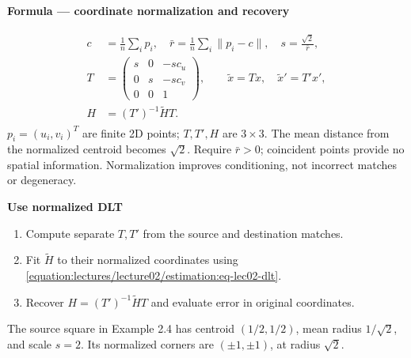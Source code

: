 \documentclass[letterpaper,11pt,english,openany,oneside]{jupyterBook}
\begin{document}
\begin{TextbookBox}
\textbf{Formula — coordinate normalization and recovery}\par\smallskip
\begin{equation}\label{equation:lectures/lecture02/estimation:eq-lec02-normalize}
\begin{split}\begin{aligned}
c&=\frac1n\sum_i p_i,\quad
\bar r=\frac1n\sum_i\|p_i-c\|,\quad s=\frac{\sqrt2}{\bar r},\\
T&=\begin{pmatrix}s&0&-sc_u\\0&s&-sc_v\\0&0&1\end{pmatrix},\qquad
\widetilde x=Tx,\quad \widetilde x'=T'x',\\
H&=(T')^{-1}\widetilde H T.
\end{aligned}\end{split}
\end{equation}
\sphinxAtStartPar
\(p_i=(u_i,v_i)^T\) are finite 2D points; \(T,T',H\) are \(3\times3\). The mean distance from the normalized centroid becomes \(\sqrt2\). Require \(\bar r>0\); coincident points provide no spatial information. Normalization improves conditioning, not incorrect matches or degeneracy.

\end{TextbookBox}

\begin{TextbookBox}
\textbf{Use normalized DLT}\par\smallskip
\begin{enumerate}
%
\item {}
\sphinxAtStartPar
Compute separate \(T,T'\) from the source and destination matches.

\item {}
\sphinxAtStartPar
Fit \(\widetilde H\) to their normalized coordinates using \eqref{equation:lectures/lecture02/estimation:eq-lec02-dlt}.

\item {}
\sphinxAtStartPar
Recover \(H=(T')^{-1}\widetilde H T\) and evaluate error in original coordinates.

\end{enumerate}

\sphinxAtStartPar
The source square in Example 2.4 has centroid \((1/2,1/2)\), mean radius \(1/\sqrt2\), and scale \(s=2\). Its normalized corners are \((\pm1,\pm1)\), at radius \(\sqrt2\).

\end{TextbookBox}
\end{document}
